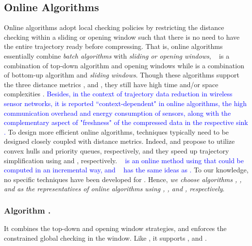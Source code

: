 \subsection{Online Algorithms}

Online \lsa algorithms adopt local checking policies by restricting the distance checking within a sliding or opening window such that there is no need to have the entire trajectory ready before compressing. That is, online algorithms essentially combine {\em batch algorithms} with {\em sliding or opening windows}, \eg\
\opwa \cite{Meratnia:Spatiotemporal} is a combination of top-down algorithm \dpa and opening windows while  \cite{Keogh:online} is a combination of bottom-up algorithm \tpa and \textit{sliding windows}.
Though these algorithms support the three distance metrics \ped, \sed and \dad, they still have high time and/or space complexities \cite{Liu:BQS}.
\textcolor{blue}{Besides, in the context of trajectory data reduction in wireless sensor networks, it is reported ``context-dependent" in online algorithms, \ie the high communication overhead and energy consumption of sensors, along with the complementary aspect of "freshness" of the compressed data in the respective sink \cite{Ghica:DTracking}.}
To design more efficient online algorithms, techniques typically need to be designed closely coupled with distance metrics.
Indeed, \bqsa \cite{Liu:BQS} and \squishe \cite{Muckell:Compression} propose to utilize convex hulls and priority queues, respectively, and they speed up trajectory simplification using \ped and \sed, respectively. 
\textcolor{blue}{\dagots~\cite{Cao:Dots} is an online method using \lissed that could be computed in an incremental way, and \olts~\cite{Wu:Graph} has the same ideas as \dagots.}
To our knowledge, no specific techniques have been developed for \dad.
Hence, {\em we choose algorithms \bqsa, \squishe, \textcolor{blue}{\dagots} and \opwa as the representatives of online algorithms using \ped, \sed, \textcolor{blue}{\lissed} and \dad, respectively}.



\subsubsection{Algorithm \opwa \cite{Meratnia:Spatiotemporal}.}
It combines the top-down and opening window strategies, and enforces the constrained global checking in the window. Like \dpa, it supports \ped, \sed and \dad.

